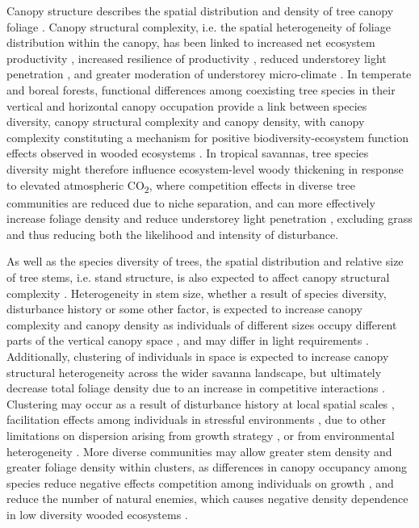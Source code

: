 \begin{refsection}
Canopy structure describes the spatial distribution and density of tree canopy foliage \citep{Lowman2004}. Canopy structural complexity, i.e. the spatial heterogeneity of foliage distribution within the canopy, has been linked to increased net ecosystem productivity \citep{Gough2019, Hardiman2011, Chen2012, Law2001, Baldocchi2001, Morin2015}, increased resilience of productivity \citep{Pretzsch2014}, reduced understorey light penetration \citep{Scheuermann2018, Sercu2017, Fotis2018}, and greater moderation of understorey micro-climate \citep{Wright2017}. In temperate and boreal forests, functional differences among coexisting tree species in their vertical and horizontal canopy occupation provide a link between species diversity, canopy structural complexity and canopy density, with canopy complexity constituting a mechanism for positive biodiversity-ecosystem function effects observed in wooded ecosystems \citep{Pretzsch2014, Barry2019}. In tropical savannas, tree species diversity might therefore influence ecosystem-level woody thickening in response to elevated atmospheric CO\textsubscript{2}, where competition effects in diverse tree communities are reduced due to niche separation, and can more effectively increase foliage density and reduce understorey light penetration \citep{Sercu2017}, excluding grass and thus reducing both the likelihood and intensity of disturbance. 

As well as the species diversity of trees, the spatial distribution and relative size of tree stems, i.e. stand structure, is also expected to affect canopy structural complexity \citep{Stark2015}. Heterogeneity in stem size, whether a result of species diversity, disturbance history or some other factor, is expected to increase canopy complexity and canopy density as individuals of different sizes occupy different parts of the vertical canopy space \citep{Panzou2020}, and may differ in light requirements \citep{CharlesDominique2018}. Additionally, clustering of individuals in space is expected to increase canopy structural heterogeneity across the wider savanna landscape, but ultimately decrease total foliage density due to an increase in competitive interactions \citep{Dohn2017}. Clustering may occur as a result of disturbance history at local spatial scales \citep{Schertzer2015, Groen2007}, facilitation effects among individuals in stressful environments \citep{Ratcliffe2017}, due to other limitations on dispersion arising from growth strategy \citep{Silva2011}, or from environmental heterogeneity \citep{Getzin2008}. More diverse communities may allow greater stem density and greater foliage density within clusters, as differences in canopy occupancy among species reduce negative effects competition among individuals on growth \citep{Gough2019}, and reduce the number of natural enemies, which causes negative density dependence in low diversity wooded ecosystems \citep{Janzen1970}.


\end{refsection}
